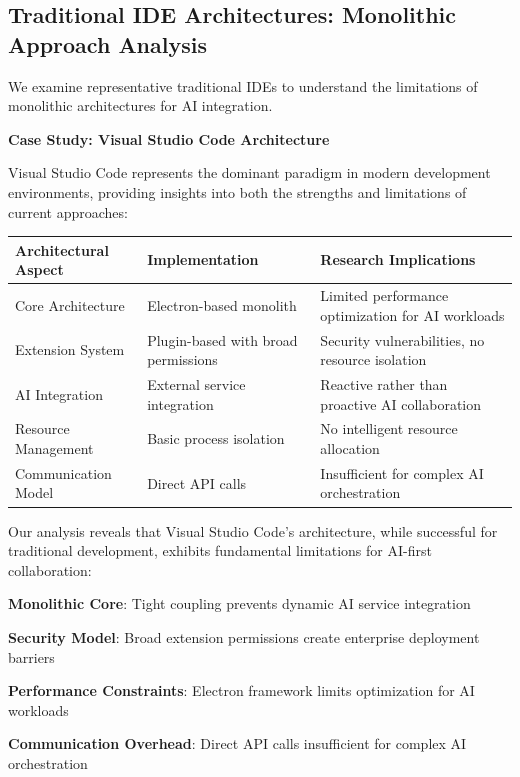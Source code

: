 \subsection{Traditional IDE Architectures: Monolithic Approach Analysis}
\label{subsec:traditional-ide-analysis}

We examine representative traditional IDEs to understand the limitations of monolithic architectures for AI integration.

\textbf{Case Study: Visual Studio Code Architecture}

Visual Studio Code represents the dominant paradigm in modern development environments, providing insights into both the strengths and limitations of current approaches:

\begin{center}
\begin{tabular}{@{}p{4cm}p{3cm}p{6cm}@{}}
\toprule
\textbf{Architectural Aspect} & \textbf{Implementation} & \textbf{Research Implications} \\
\midrule
Core Architecture & Electron-based monolith & Limited performance optimization for AI workloads \\
Extension System & Plugin-based with broad permissions & Security vulnerabilities, no resource isolation \\
AI Integration & External service integration & Reactive rather than proactive AI collaboration \\
Resource Management & Basic process isolation & No intelligent resource allocation \\
Communication Model & Direct API calls & Insufficient for complex AI orchestration \\
\bottomrule
\end{tabular}
\label{tab:vscode-architecture}
\end{center}

\begin{infobox}[title=Key Research Findings]
Our analysis reveals that Visual Studio Code's architecture, while successful for traditional development, exhibits fundamental limitations for AI-first collaboration:
\begin{compactlist}
    \item \textbf{Monolithic Core}: Tight coupling prevents dynamic AI service integration
    \item \textbf{Security Model}: Broad extension permissions create enterprise deployment barriers
    \item \textbf{Performance Constraints}: Electron framework limits optimization for AI workloads
    \item \textbf{Communication Overhead}: Direct API calls insufficient for complex AI orchestration
\end{compactlist}
\end{infobox}

